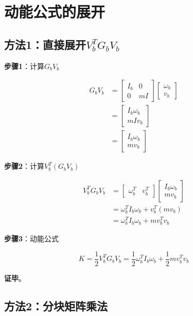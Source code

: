 \documentclass[12pt,a4paper]{article}
\begin{document}
\section{动能公式的展开}

\subsection{方法1：直接展开$V_b^T G_b V_b$}

\textbf{步骤1}：计算$G_b V_b$

\begin{align}
G_b V_b &= \begin{bmatrix} I_b & 0 \\ 0 & mI \end{bmatrix} \begin{bmatrix} \omega_b \\ v_b \end{bmatrix} \\
&= \begin{bmatrix} I_b \omega_b \\ mI v_b \end{bmatrix} \\
&= \begin{bmatrix} I_b \omega_b \\ mv_b \end{bmatrix}
\label{eq:Gb_Vb}
\end{align}

\textbf{步骤2}：计算$V_b^T (G_b V_b)$

\begin{align}
V_b^T G_b V_b &= \begin{bmatrix} \omega_b^T & v_b^T \end{bmatrix} \begin{bmatrix} I_b \omega_b \\ mv_b \end{bmatrix} \\
&= \omega_b^T I_b \omega_b + v_b^T (mv_b) \\
&= \omega_b^T I_b \omega_b + m v_b^T v_b
\label{eq:VbT_Gb_Vb}
\end{align}

\textbf{步骤3}：动能公式

\begin{equation}
K = \frac{1}{2}V_b^T G_b V_b = \frac{1}{2}\omega_b^T I_b \omega_b + \frac{1}{2}mv_b^T v_b
\end{equation}

\textbf{证毕}。

\subsection{方法2：分块矩阵乘法}
\end{document}
